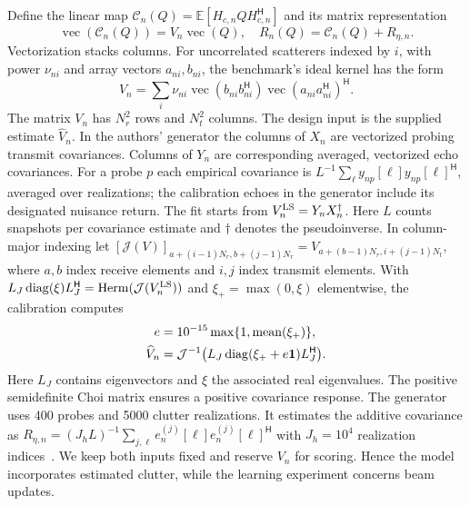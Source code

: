 \documentclass[journal]{IEEEtran}
\DeclareMathOperator{\diag}{diag}
\DeclareMathOperator{\vecop}{vec}
\DeclareMathOperator{\Herm}{Herm}
\newcommand{\Hh}{^{\mathsf H}}
\newcommand{\E}{\mathbb E}
\begin{document}
Define the linear map $\mathcal C_n(Q)=\E[H_{c,n}QH_{c,n}\Hh]$ and its matrix representation
\begin{equation}
 \vecop(\mathcal C_n(Q))=V_n\vecop(Q),\quad
 R_n(Q)=\mathcal C_n(Q)+R_{\eta,n}.
 \label{eq:map}
\end{equation}
Vectorization stacks columns. For uncorrelated scatterers indexed by $i$, with power $\nu_{ni}$ and array vectors $a_{ni},b_{ni}$, the benchmark's ideal kernel has the form
\begin{equation}
 V_n=\sum_i \nu_{ni}\vecop(b_{ni}b_{ni}\Hh)
                         \vecop(a_{ni}a_{ni}\Hh)\Hh .
\end{equation}
The matrix $V_n$ has $N_r^2$ rows and $N_t^2$ columns. The design input is the supplied estimate $\widehat V_n$. In the authors' generator the columns of $X_n$ are vectorized probing transmit covariances. Columns of $Y_n$ are corresponding averaged, vectorized echo covariances. For a probe $p$ each empirical covariance is $L^{-1}\sum_{\ell} y_{np}[\ell]y_{np}[\ell]\Hh$, averaged over realizations; the calibration echoes in the generator include its designated nuisance return. The fit starts from $V_n^{\rm LS}=Y_nX_n^\dagger$. Here $L$ counts snapshots per covariance estimate and $\dagger$ denotes the pseudoinverse. In column-major indexing let $[\mathcal J(V)]_{a+(i-1)N_r,b+(j-1)N_r}=V_{a+(b-1)N_r,i+(j-1)N_t}$, where $a,b$ index receive elements and $i,j$ index transmit elements. With $L_J\diag(\xi)L_J\Hh=\Herm(\mathcal J(V_n^{\rm LS}))$ and $\xi_+=\max(0,\xi)$ elementwise, the calibration computes
\begin{align}
 e&=10^{-15}\max\{1,\mathrm{mean}(\xi_+)\},\\
 \widehat V_n&=\mathcal J^{-1}\bigl(L_J\diag(\xi_++e{\bf1})L_J\Hh\bigr).
\end{align}
 Here $L_J$ contains eigenvectors and $\xi$ the associated real eigenvalues. The positive semidefinite Choi matrix ensures a positive covariance response. The generator uses 400 probes and 5000 clutter realizations. It estimates the additive covariance as $R_{\eta,n}=(J_hL)^{-1}\sum_{j,\ell}e_n^{(j)}[\ell]e_n^{(j)}[\ell]\Hh$ with $J_h=10^4$ realization indices~\cite{liuCode}. We keep both inputs fixed and reserve $V_n$ for scoring. Hence the model incorporates estimated clutter, while the learning experiment concerns beam updates.
\end{document}
